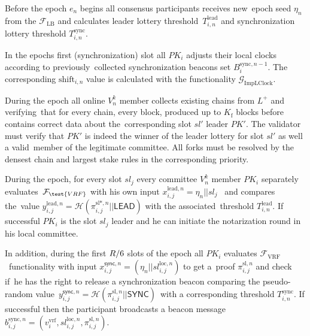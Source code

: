\begin{legal}
    \item Before the epoch $e_n$ begins all consensus participants receives new\
    epoch seed $\eta_n$ from the ${\mathcal{F}}_{\text{LB}}$ and calculates leader lottery threshold\
    $T_{i, n}^{\text{lead}}$ and synchronization lottery threshold $T_{i, n}^{\text{sync}}$.

    \item In the epochs first (synchronization) slot all $PK_i$ adjusts their local clocks according to previously\
    collected synchronization beacons set $B_i^{\text{sync}, n - 1}$.
    The corresponding $\text{shift}_{i, n}$ value is calculated with the functionality $\mathcal{G}_{\text{ImpLClock}}$.

    \item During the epoch all online $V^k_n$ member collects existing chains from $L^+$ and verifying\
    that for every chain, every block, produced up to $K_{\text{f}}$ blocks before contains correct data about the\
    corresponding slot $sl'$ leader $PK'$.
    The validator must verify that $PK'$ is indeed the winner of the leader lottery for slot $sl'$ as well a valid\
    member of the legitimate committee.
    All forks must be resolved by the densest chain and largest stake rules in the corresponding priority.

    \item During the epoch, for every slot $sl_j$ every committee $V^k_n$ member $PK_i$ separately evaluates\
    ${\mathcal{F}}_{\test{VRF}}$ with his own input ${x_{i, j}^{\text{lead}, n} = \eta_n || sl_j}$ \ and compares the\
    value ${y_{i, j}^{\text{lead}, n} = \mathcal{H}(\pi_{i, j}^{\text{sl}*, n}||\textsf{LEAD})}$ with the associated\
    threshold $T_{i, n}^{\text{lead}}$.
    If successful $PK_i$ is the slot $sl_j$ leader and he can initiate the notarization round in his local committee.

    In addition, during the first $R\//6$ slots of the epoch all $PK_i$ evaluates $\mathcal{F}_{\text{VRF}}$\
    functionality with input ${x_{i, j}^{\textsf{sync}, n} = (\eta_n || sl_{i, j}^{\text{loc}, n})}$ to get a\
    proof $\pi_{i, j}^{\text{sl}, n}$ and check if\
    he has the right to release a synchronization beacon comparing the pseudo-random value\
    ${y_{i, j}^{\textsf{sync}, n} = \mathcal{H}(\pi_{i, j}^{\text{sl}, n} || \textsf{SYNC})}$\
    with a corresponding threshold $T_{i, n}^{\text{sync}}$.
    If successful then the participant broadcasts a beacon message\
    $b_{i, j}^{\text{sync}, n} = (v^{\text{vrf}}_i, sl_{i, j}^{\text{loc}, n}, \pi_{i, j}^{\text{sl}, n})$.


\end{legal}
